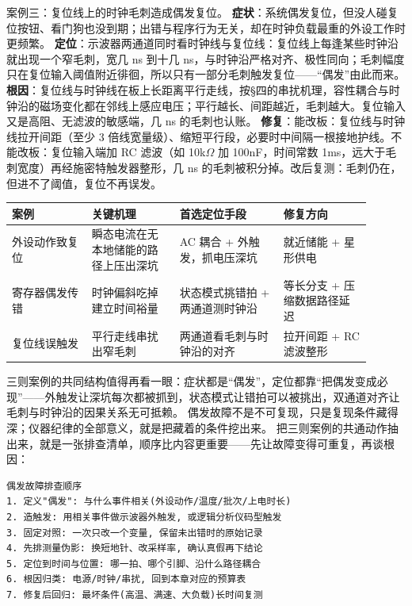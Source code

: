 案例三：复位线上的时钟毛刺造成偶发复位。
\textbf{症状}：系统偶发复位，但没人碰复位按钮、看门狗也没到期；出错与程序行为无关，却在时钟负载最重的外设工作时更频繁。
\textbf{定位}：示波器两通道同时看时钟线与复位线：复位线上每逢某些时钟沿就出现一个窄毛刺，宽几 ns 到十几 ns，与时钟沿严格对齐、极性同向；毛刺幅度只在复位输入阈值附近徘徊，所以只有一部分毛刺触发复位——“偶发”由此而来。
\textbf{根因}：复位线与时钟线在板上长距离平行走线，按§四的串扰机理，容性耦合与时钟沿的磁场变化都在邻线上感应电压；平行越长、间距越近，毛刺越大。复位输入又是高阻、无滤波的敏感端，几 ns 的毛刺也认账。
\textbf{修复}：能改板：复位线与时钟线拉开间距（至少 3 倍线宽量级）、缩短平行段，必要时中间隔一根接地护线。不能改板：复位输入端加 RC 滤波（如 10k$\Omega$ 加 100nF，时间常数 1ms，远大于毛刺宽度）再经施密特触发器整形，几 ns 的毛刺被积分掉。改后复测：毛刺仍在，但进不了阈值，复位不再误发。

\begin{longtable}{L{0.20\linewidth}L{0.22\linewidth}L{0.26\linewidth}L{0.22\linewidth}}
\toprule
案例 & 关键机理 & 首选定位手段 & 修复方向 \\
\midrule
外设动作致复位 & 瞬态电流在无本地储能的路径上压出深坑 & AC 耦合 + 外触发，抓电压深坑 & 就近储能 + 星形供电 \\
寄存器偶发传错 & 时钟偏斜吃掉建立时间裕量 & 状态模式挑错拍 + 两通道测时钟沿 & 等长分支 + 压缩数据路径延迟 \\
复位线误触发 & 平行走线串扰出窄毛刺 & 两通道看毛刺与时钟沿的对齐 & 拉开间距 + RC 滤波整形 \\
\bottomrule
\end{longtable}

三则案例的共同结构值得再看一眼：症状都是“偶发”，定位都靠“把偶发变成必现”——外触发让深坑每次都被抓到，状态模式让错拍可以被挑出，双通道对齐让毛刺与时钟沿的因果关系无可抵赖。
偶发故障不是不可复现，只是复现条件藏得深；仪器纪律的全部意义，就是把藏着的条件挖出来。
把三则案例的共通动作抽出来，就是一张排查清单，顺序比内容更重要——先让故障变得可重复，再谈根因：

\begin{lstlisting}
偶发故障排查顺序
1. 定义"偶发": 与什么事件相关(外设动作/温度/批次/上电时长)
2. 造触发: 用相关事件做示波器外触发, 或逻辑分析仪码型触发
3. 固定对照: 一次只改一个变量, 保留未出错时的原始记录
4. 先排测量伪影: 换短地针、改采样率, 确认真假再下结论
5. 定位到时间与位置: 哪一拍、哪个引脚、沿什么路径耦合
6. 根因归类: 电源/时钟/串扰, 回到本章对应的预算表
7. 修复后回归: 最坏条件(高温、满速、大负载)长时间复测
\end{lstlisting}

